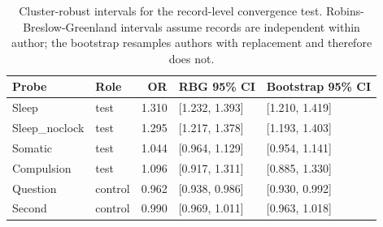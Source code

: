\begin{table}[!t]
\caption{Cluster-robust intervals for the record-level convergence test.
Robins-Breslow-Greenland intervals assume records are independent within
author; the bootstrap resamples authors with replacement and therefore does
not.}
\label{tab:mhrobust}
\centering
\footnotesize
\begin{tabular}{@{}llr@{\hspace{4pt}}l@{\hspace{4pt}}l@{}}
\toprule
Probe & Role & OR & RBG 95\% CI & Bootstrap 95\% CI \\
\midrule
Sleep & test & 1.310 & [1.232, 1.393] & [1.210, 1.419] \\
Sleep_noclock & test & 1.295 & [1.217, 1.378] & [1.193, 1.403] \\
Somatic & test & 1.044 & [0.964, 1.129] & [0.954, 1.141] \\
Compulsion & test & 1.096 & [0.917, 1.311] & [0.885, 1.330] \\
Question & control & 0.962 & [0.938, 0.986] & [0.930, 0.992] \\
Second & control & 0.990 & [0.969, 1.011] & [0.963, 1.018] \\
\bottomrule
\end{tabular}
\end{table}
